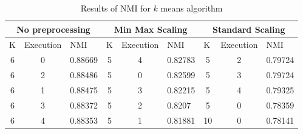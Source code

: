 \documentclass[12pt]{article}
\begin{document}
\begin{table}[h]
\centering
\begin{tabular}{|cc|l|cc|l|cc|l|}
\hline
\multicolumn{3}{|c|}{No preprocessing}                            & \multicolumn{3}{c|}{Min Max Scaling}                             & \multicolumn{3}{c|}{Standard Scaling}                            \\ \hline
\multicolumn{1}{|l}{K} & \multicolumn{1}{l|}{Execution} & NMI     & \multicolumn{1}{l}{K} & \multicolumn{1}{l|}{Execution} & NMI     & \multicolumn{1}{l}{K} & \multicolumn{1}{l|}{Execution} & NMI     \\ \hline
6                      & 0                              & 0.88669 & 5                     & 4                              & 0.82783 & 5                     & 2                              & 0.79724 \\
6                      & 2                              & 0.88486 & 5                     & 0                              & 0.82599 & 5                     & 3                              & 0.79724 \\
6                      & 1                              & 0.88475 & 5                     & 3                              & 0.82215 & 5                     & 4                              & 0.79325 \\
6                      & 3                              & 0.88372 & 5                     & 2                              & 0.8207  & 5                     & 0                              & 0.78359 \\
6                      & 4                              & 0.88353 & 5                     & 1                              & 0.81881 & 10                    & 0                              & 0.78141 \\ \hline
\end{tabular}
\caption{Results of NMI for $k$ means algorithm}
\label{res:k-means}
\end{table}
\end{document}
